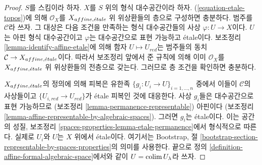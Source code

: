 \begin{proof}
$S$를 스킴이라 하자. $X$를 $S$ 위의 형식 대수공간이라 하자.
(\ref{equation-etale-topos})에 의해 $\mathcal{O}_X$를
$X_{affine, {\acute{e}tale}}$ 위 위상환들의 층으로 구성하면 충분하다.
범주를 $\mathcal{C}$라 쓰자. 그 대상은 다음 조건을 만족하는 형식
대수공간들의 사상 $\varphi : U \to X$이다.
$U$는 아핀 형식 대수공간이고 $\varphi$는 대수공간으로 표현 가능하고
\'etale이다. 보조정리 \ref{lemma-identify-affine-etale}에 의해
함자 $U \mapsto U_{red}$는 범주들의 동치
$\mathcal{C} \to X_{affine, {\acute{e}tale}}$이다. 따라서 보조정리 앞에서
준 규칙에 의해 이미 $\mathcal{O}_X$를 $X_{affine, {\acute{e}tale}}$ 위
위상환들의 전층으로 갖는다. 그러므로 층 조건을 확인하면 충분하다.

\medskip\noindent
$X_{affine, {\acute{e}tale}}$의 정의에 의해 피복은 유한족
$\{g_i : U_i \to U\}_{i = 1, \ldots, n}$ 중에서 이들이
$\mathcal{C}$의 사상들이고
$\{U_{i, red} \to U_{red}\}$가 \'etale 피복인 것에 대응한다.
사상 $g_i$들은 대수공간으로 표현 가능하므로
(보조정리 \ref{lemma-permanence-representable}) 아핀이다
(보조정리 \ref{lemma-affine-representable-by-algebraic-spaces}).
그러면 $g_i$는 \'etale이다. 이는 공간의 성질, 보조정리
\ref{spaces-properties-lemma-etale-permanence}에서 형식적으로 따른다.
실제로 $U_i$와 $U$는 $X$ 위에서 \'etale이다. 여기서는 Bootstrap, 절
\ref{bootstrap-section-representable-by-spaces-properties}의 의미를 사용한다.
끝으로 정의 \ref{definition-affine-formal-algebraic-space}에서와 같이
$U = \mathop{\mathrm{colim}}\nolimits U_\lambda$라 쓰자.


\end{proof}
